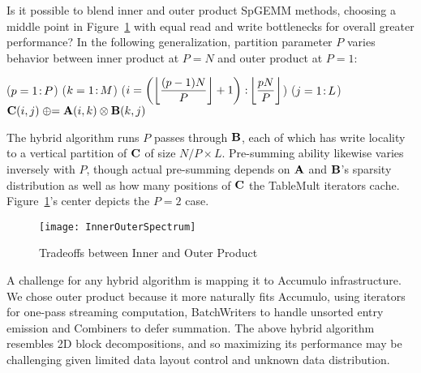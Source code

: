 Is it possible to blend inner and outer product SpGEMM methods,
choosing a middle point in Figure~\ref{fInnerOuterSpectrum}
with equal read and write bottlenecks for overall greater performance?
In the following generalization, 
partition parameter $P$ varies behavior between
inner product at $P=N$ and outer product at $P=1$:

\removelatexerror
\begin{algorithm}[H]
\vspace{\algspace}
\fore($p = 1\colon\! P$){
\fore($k = 1\colon\! M$){
\fore({$i = \left( \floor*{\dfrac{(p-1)N}{P}}+1 \right) \col \floor*{\dfrac{p N}{P}}$}){
\fore($j = 1\colon\! L$){
{$\mathbf{C}(i,j) \mathrel{\oplus}= \mathbf{A}(i,k) \otimes \mathbf{B}(k,j)$}
}}}}
\vspace{\algspace}
\end{algorithm}

The hybrid algorithm runs $P$ passes through $\mathbf{B}$,
each of which has write locality to a vertical partition of $\mathbf{C}$ of size $N/P \times L$.
Pre-summing ability likewise varies inversely with $P$, 
though actual pre-summing depends on
$\mathbf{A}$ and $\mathbf{B}$'s  sparsity distribution
as well as how many positions of $\mathbf{C}$ the TableMult iterators cache.
Figure~\ref{fInnerOuterSpectrum}'s center depicts the $P=2$ case.

\begin{figure}[htb]
\vspace{-4pt}
\centering
\texttt{[image: InnerOuterSpectrum]}
\vspace{-14pt}
\caption{Tradeoffs between Inner and Outer Product}
\label{fInnerOuterSpectrum}
\vspace{-4pt}
\end{figure}


A challenge for any hybrid algorithm is mapping it to Accumulo infrastructure.
We chose outer product because it more naturally fits Accumulo, 
using iterators for one-pass streaming computation, 
BatchWriters to handle unsorted entry emission and Combiners to defer summation.
The above hybrid algorithm resembles 2D block decompositions,
and so maximizing its performance may be challenging 
given limited data layout control and unknown data distribution.


